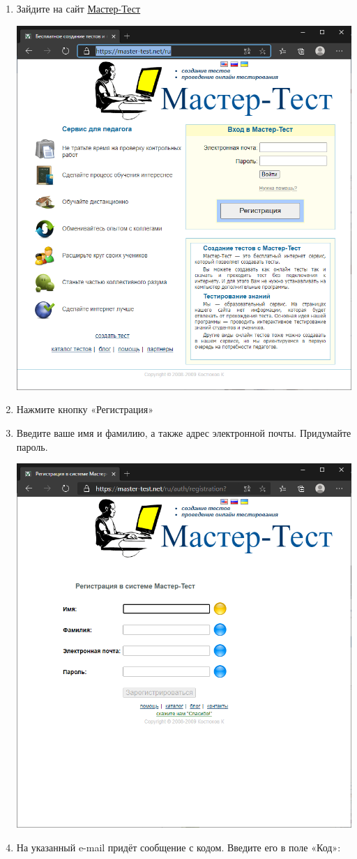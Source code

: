 \documentclass[
  12pt,
]{book}
\begin{document}
\begin{enumerate}
\def\labelenumi{\arabic{enumi}.}
\item
  Зайдите на сайт \href{https://master-test.net/ru}{Мастер-Тест}

  \includegraphics{./images/instruction/001.png}
\item
  Нажмите кнопку «Регистрация»
\item
  Введите ваше имя и фамилию, а также адрес электронной почты. Придумайте пароль.

  \includegraphics{./images/instruction/002.png}
\item
  На указанный e-mail придёт сообщение с кодом. Введите его в поле «Код»:


\end{enumerate}
\end{document}
